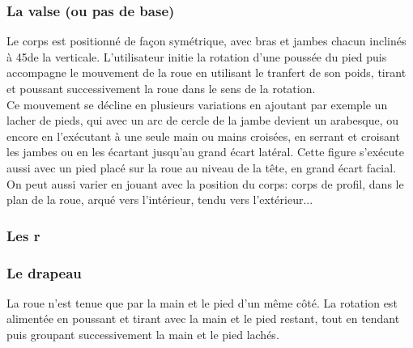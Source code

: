 \subsubsection{La valse (ou pas de base)}
Le corps est positionné de façon symétrique, avec bras et jambes chacun inclinés à 45\degree de la verticale. L'utilisateur initie la rotation d'une poussée du pied puis accompagne le mouvement de la roue en utilisant le tranfert de son poids, tirant et poussant successivement la roue dans le sens de la rotation.\\
Ce mouvement se décline en plusieurs variations en ajoutant par exemple un lacher de pieds, qui avec un arc de cercle de la jambe devient un arabesque, ou encore en l'exécutant à une seule main ou mains croisées, en serrant et croisant les jambes ou en les écartant jusqu'au grand écart latéral. Cette figure s'exécute aussi avec un pied placé sur la roue au niveau de la tête, en grand écart facial. On peut aussi varier en jouant avec la position du corps: corps de profil, dans le plan de la roue, arqué vers l'intérieur, tendu vers l'extérieur...

\subsubsection{Les r}

\subsubsection{Le drapeau}
La roue n'est tenue que par la main et le pied d'un même côté. La rotation est alimentée en poussant et tirant avec la main et le pied restant, tout en tendant puis groupant successivement la main et le pied lachés.

\subsunsection{}

\clearpage


